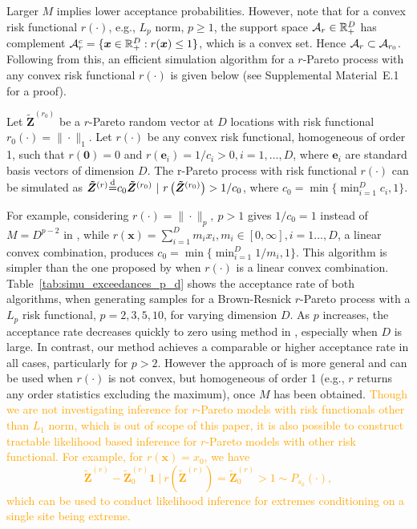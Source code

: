 \documentclass[12pt]{article}
\newcommand{\PZ}{\textcolor{orange}}
\begin{document}
Larger $M$ implies lower acceptance probabilities. 
However, note that for a convex risk functional $r(\cdot)$, e.g., $L_p$ norm, $p\geq 1$, the support space ${\mathcal A}_r \in \mathbb R_+^D$ has complement ${\mathcal A}_r^c=\{\bm x\in\mathbb R_+^D: r(\bm x)\leq 1\}$, which is a convex set. Hence ${\mathcal A}_r\subset {\mathcal A}_{r_0}$. Following from this, an efficient simulation algorithm for a $r$-Pareto process with any convex risk functional $r(\cdot)$ is given below (see Supplemental Material~E.1 for a proof). 
%    
\begin{theorem}\label{thm:r_pareto_simulation}
Let $\bm{\tilde Z}^{(r_0)}$ be a $r$-Pareto random vector at $D$ locations with risk functional $r_0(\cdot)=\|\cdot\|_1$. Let $r(\cdot)$ be any convex risk functional, homogeneous of order 1, such that $r(\bm 0)=0$ and $r(\bm e_i)=1/c_i>0, i=1,\dots,D$, where $\bm e_i$ are standard basis vectors of dimension $D$.
%
The r-Pareto process with risk functional $r(\cdot)$ can be simulated as $\bm{\tilde Z}^{(r)}{\stackrel{\mathrm{d}}{=}} c_0\bm{\tilde Z}^{(r_0)}\ | \ r\left(\bm{\tilde Z}^{(r_0)}\right) > 1/c_0$, where $c_0 = \min\{\min_{i=1}^D c_i,1\}$.
\end{theorem}
%
For example, considering $r(\cdot)=\|\cdot\|_p,\ p>1$ gives $1/c_0 = 1$ instead of $M=D^{p-2}$ in \citet{Dombry.etal:2024}, while $r(\bm x)=\sum_{i=1}^D m_ix_i, m_i\in [0,\infty],i=1\dots,D$, a linear convex combination, produces $c_0=\min\{\min_{i=1}^D 1/m_i,1\}$. This algorithm is simpler than the one proposed by \citet[Proposition 1]{Dombry.etal:2024} when $r(\cdot)$ is a linear convex combination. Table~\ref{tab:simu_exceedances_p_d} shows the acceptance rate of both algorithms, when generating samples for a Brown-Resnick $r$-Pareto process with a $L_p$ risk functional, $p=2,3,5,10$, for varying dimension $D$. 
%
As $p$ increases, the acceptance rate decreases quickly to zero using method in \citet{Dombry.etal:2024}, especially when $D$ is large. In contrast, our method achieves a comparable or higher acceptance rate
in all cases, particularly for $p>2$.   
%
However the approach of \citet{Dombry.etal:2024} is more general and can be used when $r(\cdot)$ is not convex, but homogeneous of order 1 (e.g., $r$ returns any order statistics excluding the maximum), once $M$ has been obtained. \PZ{Though we are not investigating inference for $r$-Pareto models with risk functionals other than $L_1$ norm, which is out of scope of this paper, it is also possible to construct tractable likelihood based inference for $r$-Pareto models with other risk functional. For example, for $r(\bm x) = x_0$, we have 
$$\bm{\tilde Z}^{(r)} - \bm{\tilde Z}^{(r)}_0 \bm 1\ |\ r(\bm{\tilde Z}^{(r)}) = \bm{\tilde Z}^{(r)}_0 > 1 \sim P_{s_0}(\cdot),$$ 
which can be used to conduct likelihood inference for extremes conditioning on a single site being extreme.}
\end{document}
